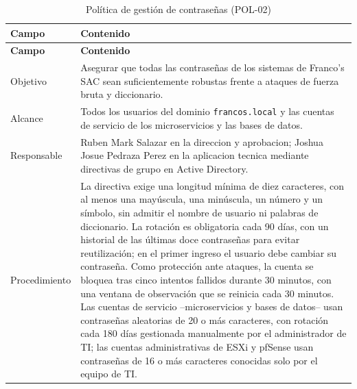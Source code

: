 \documentclass[11pt, a4paper, oneside]{report}
\begin{document}
\begin{xltabular}{\textwidth}{@{}|L{2.6cm}|X|@{}}
\caption{Política de gestión de contraseñas (POL-02)}
\label{tab:pol02_contrasenas} \\

\parbox[c][1.1cm][c]{\linewidth}{\centering\color{white}\bfseries\small Campo} &
\parbox[c][1.1cm][c]{\linewidth}{\centering\color{white}\bfseries\small Contenido} \\ \hline
\endfirsthead

\parbox[c][1.1cm][c]{\linewidth}{\centering\color{white}\bfseries\small Campo} &
\parbox[c][1.1cm][c]{\linewidth}{\centering\color{white}\bfseries\small Contenido} \\ \hline
\endhead

\hline
\endfoot

{\small Objetivo} & {\small Asegurar que todas las contraseñas de los sistemas de Franco's SAC sean suficientemente robustas frente a ataques de fuerza bruta y diccionario.} \\ \hline

{\small Alcance} & {\small Todos los usuarios del dominio \texttt{francos.local} y las cuentas de servicio de los microservicios y las bases de datos.} \\ \hline

{\small Responsable} & {\small Ruben Mark Salazar en la direccion y aprobacion; Joshua Josue Pedraza Perez en la aplicacion tecnica mediante directivas de grupo en Active Directory.} \\ \hline

{\small Procedimiento} & {\small La directiva exige una longitud mínima de diez caracteres, con al menos una mayúscula, una minúscula, un número y un símbolo, sin admitir el nombre de usuario ni palabras de diccionario. La rotación es obligatoria cada 90 días, con un historial de las últimas doce contraseñas para evitar reutilización; en el primer ingreso el usuario debe cambiar su contraseña. Como protección ante ataques, la cuenta se bloquea tras cinco intentos fallidos durante 30 minutos, con una ventana de observación que se reinicia cada 30 minutos. Las cuentas de servicio --microservicios y bases de datos-- usan contraseñas aleatorias de 20 o más caracteres, con rotación cada 180 días gestionada manualmente por el administrador de TI; las cuentas administrativas de ESXi y pfSense usan contraseñas de 16 o más caracteres conocidas solo por el equipo de TI.} \\ \hline


\end{xltabular}
\end{document}
